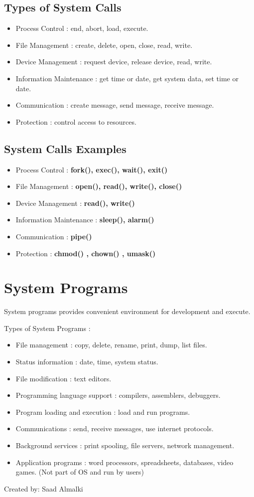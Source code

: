 \documentclass[12pt]{article}
\begin{document}
\subsection{Types of System Calls}
\begin{itemize}
    \item Process Control : end, abort, load, execute.
    \item File Management : create, delete, open, close, read, write.
    \item Device Management : request device, release device, read, write.
    \item Information Maintenance : get time or date, get system data, set time or date.
    \item Communication : create message, send message, receive message.
    \item Protection : control access to resources.
\end{itemize}

\subsection{System Calls Examples}
\begin{itemize}
    \item Process Control : \textbf{fork(), exec(), wait(), exit()}
    \item File Management : \textbf{open(), read(), write(), close()}
    \item Device Management : \textbf{read(), write()}
    \item Information Maintenance : \textbf{sleep(), alarm()}
    \item Communication : \textbf{pipe()}
    \item Protection : \textbf{chmod() , chown() , umask()}
\end{itemize}

\section{System Programs}
System programs provides convenient environment for development and execute.

Types of System Programs :
\begin{itemize}
    \item File management : copy, delete, rename, print, dump, list files.
    \item Status information : date, time, system status.
    \item File modification : text editors.
    \item Programming language support : compilers, assemblers, debuggers.
    \item Program loading and execution : load and run programs.
    \item Communications : send, receive messages, use internet protocols.
    \item Background services : print spooling, file servers, network management.
    \item Application programs : word processors, spreadsheets, databases, video games. (Not part of OS and run by users)
\end{itemize}

\begin{flushright}
Created by: Saad Almalki \\
\end{flushright}
\end{document}
